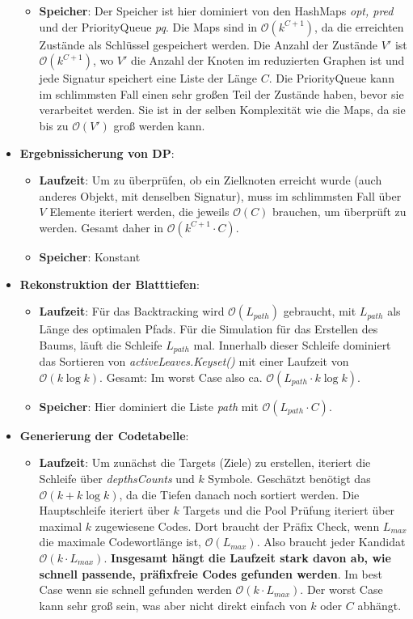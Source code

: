 \documentclass[a4paper,10pt,ngerman]{scrartcl}
\begin{document}
\begin{itemize}
\begin{itemize}
    \item \textbf{Speicher}:
    Der Speicher ist hier dominiert von den HashMaps \textit{opt, pred} und der PriorityQueue \textit{pq}. Die Maps sind in $\mathcal{O}(k^{C+1})$, da die erreichten Zustände als Schlüssel gespeichert werden. Die Anzahl der Zustände $V'$ ist $\mathcal{O}(k^{C+1})$, wo $V'$ die Anzahl der Knoten im reduzierten Graphen ist und jede Signatur speichert eine Liste der Länge $C$. Die PriorityQueue kann im schlimmsten Fall einen sehr großen Teil der Zustände haben, bevor sie verarbeitet werden. Sie ist in der selben Komplexität wie die Maps, da sie bis zu $\mathcal{O}(V')$ groß werden kann.
  \end{itemize}
  \item \textbf{Ergebnissicherung von DP}:
  \begin{itemize}
    \item \textbf{Laufzeit}:
    Um zu überprüfen, ob ein Zielknoten erreicht wurde (auch anderes Objekt, mit denselben Signatur), muss im schlimmsten Fall über $V$ Elemente iteriert werden, die jeweils $\mathcal{O}(C)$ brauchen, um überprüft zu werden. Gesamt daher in $\mathcal{O}(k^{C+1} \cdot C)$.
    \item \textbf{Speicher}: Konstant
  \end{itemize}
  \item \textbf{Rekonstruktion der Blatttiefen}:
  \begin{itemize}
    \item \textbf{Laufzeit}:
    Für das Backtracking wird $\mathcal{O}(L_{path})$ gebraucht, mit $L_{path}$ als Länge des optimalen Pfads. Für die Simulation für das Erstellen des Baums, läuft die Schleife $L_{path}$ mal. Innerhalb dieser Schleife dominiert das Sortieren von \textit{activeLeaves.Keyset()} mit einer Laufzeit von $\mathcal{O}(k \log k)$. Gesamt: Im worst Case also ca. $\mathcal{O}(L_{path}\cdot k \log k)$.
    \item \textbf{Speicher}:
    Hier dominiert die Liste \textit{path} mit $\mathcal{O}(L_{path} \cdot C)$.
  \end{itemize}
  \item \textbf{Generierung der Codetabelle}:
  \begin{itemize}
    \item \textbf{Laufzeit}:
    Um zunächst die Targets (Ziele) zu erstellen, iteriert die Schleife über \textit{depthsCounts} und $k$ Symbole. Geschätzt benötigt das $\mathcal{O}(k+ k\log k)$, da die Tiefen danach noch sortiert werden. Die Hauptschleife iteriert über $k$ Targets und die Pool Prüfung iteriert über maximal $k$ zugewiesene Codes. Dort braucht der Präfix Check, wenn $L_{max}$ die maximale Codewortlänge ist, $\mathcal{O}(L_{max})$. Also braucht jeder Kandidat $\mathcal{O}(k\cdot L_{max})$. \textbf{Insgesamt hängt die Laufzeit stark davon ab, wie schnell passende, präfixfreie Codes gefunden werden}. Im best Case wenn sie schnell gefunden werden $\mathcal{O}(k\cdot L_{max})$. Der worst Case kann sehr groß sein, was aber nicht direkt einfach von $k$ oder $C$ abhängt.

\end{itemize}
\end{itemize}
\end{document}
